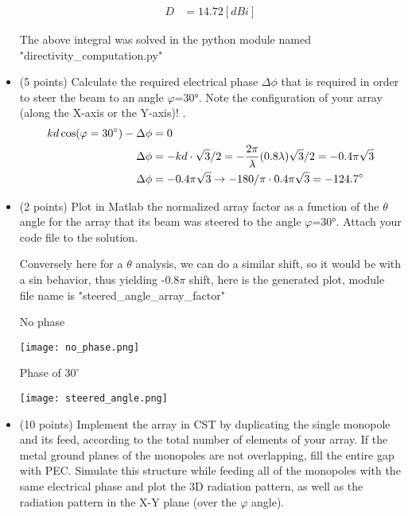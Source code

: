 \documentclass[12pt, letterpaper]{article}
\begin{document}
\begin{itemize}
  \begin{align}
    D
    &=
    14.72[dBi]
  \end{align}

  {\color{blue} The above integral was solved in the python module named "directivity\_computation.py"}

  \item (5 points) Calculate the required electrical phase $\Delta\phi$ that is required in order to steer the beam to an angle $\varphi$=30°. Note the configuration of your array (along the X-axis or the Y-axis)!
.
  \begin{align}
    kd\cos(\varphi=30^{\circ})-\Delta\phi
    &=
    0
    \\
    \Delta\phi
    &=
    -kd\cdot\sqrt{3}/2
    =
    -{2\pi\over\lambda}(0.8\lambda)\sqrt{3}/2
    =
    -0.4\pi\sqrt{3}
    \\
    \Delta\phi
    &=
    -0.4\pi\sqrt{3}
    \rightarrow
    -180/\pi\cdot0.4\pi\sqrt{3}=-124.7^{\circ}
  \end{align}

  \item (2 points) Plot in Matlab the normalized array factor as a function of the
  $\theta$ angle for the array that its beam was steered to the angle $\varphi$=30°. Attach your code file to the solution.

  {\color{blue}Conversely here for a $\theta$ analysis, we can do a similar shift, so it would be with a sin behavior, thus yielding -$0.8\pi$ shift, here is the generated plot, module file name is "steered\_angle\_array\_factor"}

  \pagebreak
  \begin{center}
    No phase
  \end{center}
  \texttt{[image: no\_phase.png]}

  \pagebreak
  \begin{center}
    Phase of $30^{\circ}$
  \end{center}
  \texttt{[image: steered\_angle.png]}

  \item (10 points) Implement the array in CST by duplicating the single monopole and its feed, according to the total number of elements of your array. If the metal ground planes of the monopoles are not overlapping, fill the entire gap with PEC. Simulate this structure while feeding all of the monopoles with the same electrical phase and plot the 3D radiation pattern, as well as the radiation pattern in the X-Y plane (over the $\varphi$ angle).


\end{itemize}
\end{document}
